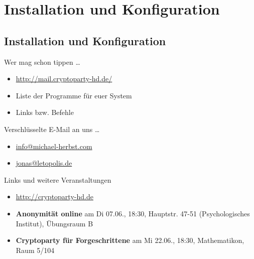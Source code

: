 \section{Installation und Konfiguration}
\subsection*{Installation und Konfiguration}
\begin{frame}{Wer mag schon tippen \dots}
	\begin{itemize}
		\item \url{http://mail.cryptoparty-hd.de/}
		\item Liste der Programme für euer System
		\item Links bzw. Befehle
	\end{itemize}
\end{frame}

\blackframe

%

\begin{frame}{Verschlüsselte E-Mail an uns \dots}
	\begin{itemize}
		\item \url{info@michael-herbst.com}
		\item \url{jonas@letopolis.de}
	\end{itemize}
\end{frame}

\blackframe

%
%
%

\begin{frame}{Links und weitere Veranstaltungen}
	\begin{itemize}
		\item \url{http://cryptoparty-hd.de} \\[10pt]
		\item \textbf{Anonymität online} am Di 07.06., 18:30, Hauptstr. 47-51 (Psychologisches Institut), Übungsraum B
		\item \textbf{Cryptoparty für Forgeschrittene} am Mi 22.06., 18:30, Mathematikon, Raum 5/104
	\end{itemize}
\end{frame}



